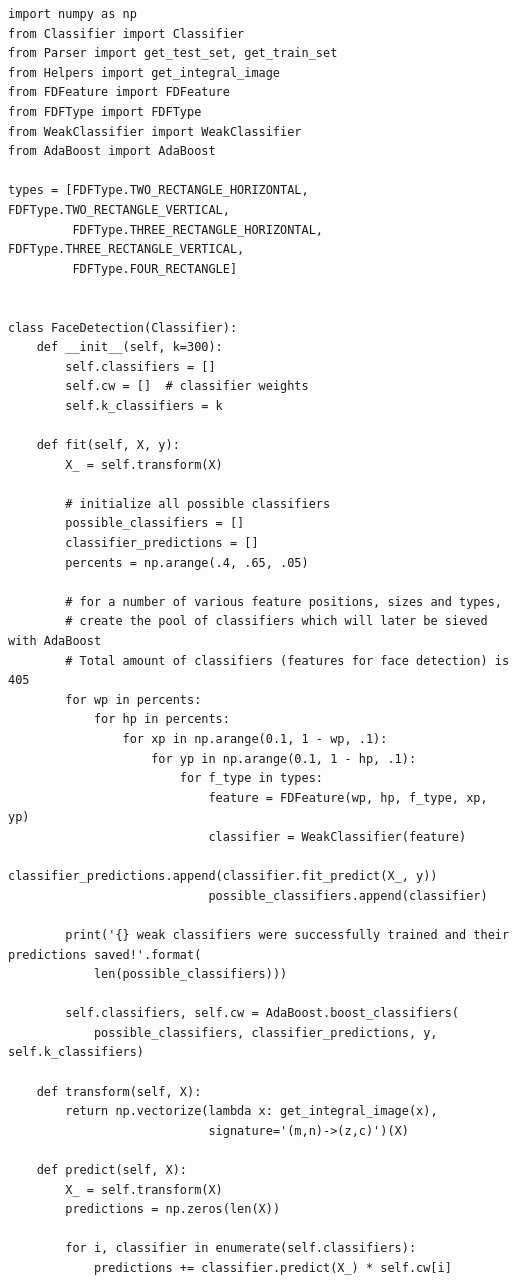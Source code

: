 \begin{lstlisting}[style=py]
import numpy as np
from Classifier import Classifier
from Parser import get_test_set, get_train_set
from Helpers import get_integral_image
from FDFeature import FDFeature
from FDFType import FDFType
from WeakClassifier import WeakClassifier
from AdaBoost import AdaBoost

types = [FDFType.TWO_RECTANGLE_HORIZONTAL, FDFType.TWO_RECTANGLE_VERTICAL,
         FDFType.THREE_RECTANGLE_HORIZONTAL, FDFType.THREE_RECTANGLE_VERTICAL,
         FDFType.FOUR_RECTANGLE]


class FaceDetection(Classifier):
    def __init__(self, k=300):
        self.classifiers = []
        self.cw = []  # classifier weights
        self.k_classifiers = k

    def fit(self, X, y):
        X_ = self.transform(X)

        # initialize all possible classifiers
        possible_classifiers = []
        classifier_predictions = []
        percents = np.arange(.4, .65, .05)

        # for a number of various feature positions, sizes and types,
        # create the pool of classifiers which will later be sieved with AdaBoost
        # Total amount of classifiers (features for face detection) is 405
        for wp in percents:
            for hp in percents:
                for xp in np.arange(0.1, 1 - wp, .1):
                    for yp in np.arange(0.1, 1 - hp, .1):
                        for f_type in types:
                            feature = FDFeature(wp, hp, f_type, xp, yp)
                            classifier = WeakClassifier(feature)
                            classifier_predictions.append(classifier.fit_predict(X_, y))
                            possible_classifiers.append(classifier)

        print('{} weak classifiers were successfully trained and their predictions saved!'.format(
            len(possible_classifiers)))

        self.classifiers, self.cw = AdaBoost.boost_classifiers(
            possible_classifiers, classifier_predictions, y, self.k_classifiers)

    def transform(self, X):
        return np.vectorize(lambda x: get_integral_image(x),
                            signature='(m,n)->(z,c)')(X)

    def predict(self, X):
        X_ = self.transform(X)
        predictions = np.zeros(len(X))

        for i, classifier in enumerate(self.classifiers):
            predictions += classifier.predict(X_) * self.cw[i]


\end{lstlisting}
